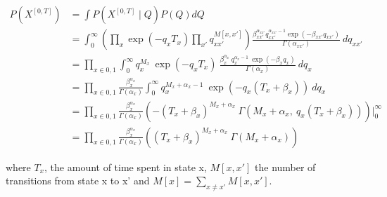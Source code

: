 \begin{align}
P(X^{[0, T]}) & = \int  P(X^{[0, T]}\mid Q)P(Q) dQ \\ & = \int_{0}^{\infty} \left( \prod_{x} \exp(-q_{x}T_{x}) \prod_{x'} q_{xx'}^{M[x, x']}\right) \frac{\beta_{xx'}^{\alpha_{xx'}}{q_{xx'}^{\alpha_{xx'}-1}}\exp(-\beta_{xx'}q_{xx'})}{\Gamma(\alpha_{xx'})} \ dq_{xx'} \\ & = \prod_{x\in{0,1}}\int_{0}^{\infty} q_{x}^{M_{x}} \ \exp(-q_{x}T_{x}) \  \frac{\beta_{x}^{\alpha_{x}} \ q_{x}^{\alpha_{x}-1}\ \exp(-\beta_{x}q_{x})}{\Gamma(\alpha_{x})} \ dq_{x} \\ & = \prod_{x\in{0,1}} \frac{\beta_{x}^{\alpha_{x}}}{\Gamma(\alpha_{x})} \int_{0}^{\infty} q_{x}^{M_{x} + \alpha_{x} -1} \ \exp(-q_{x}(T_{x}+\beta_{x})) \ dq_{x} \\ & = \prod_{x\in{0,1}} \frac{\beta_{x}^{\alpha_{x}}}{\Gamma(\alpha_{x})} \left( -(T_{x}+\beta_{x})^{M_{x} + \alpha_{x}}\ \Gamma(M_{x} + \alpha_{x}, \ q_{x}(T_{x}+\beta_{x})) \right) \Big|_0^\infty  \\ & = \prod_{x\in{0,1}} \frac{\beta_{x}^{\alpha_{x}}}{\Gamma(\alpha_{x})} \left( (T_{x}+\beta_{x})^{M_{x} + \alpha_{x}}\ \Gamma(M_{x} + \alpha_{x}) \right)
\label{eq:Marg_traj}
\end{align}

where $ T_{x} $, the amount of time spent in state x, $ M[x,x'] $ the number of transitions from state x to x' and  $ M[x] = \sum_{x\neq x'}M[x,x'] $.\\

%

